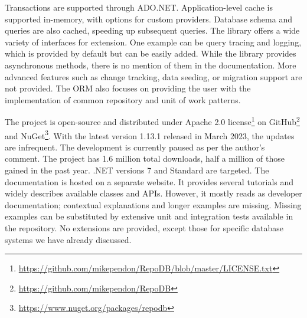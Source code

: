 Transactions are supported through ADO.NET. Application-level cache is supported in-memory, with options for custom providers. Database schema and queries are also cached, speeding up subsequent queries. The library offers a wide variety of interfaces for extension. One example can be query tracing and logging, which is provided by default but can be easily added. While the library provides asynchronous methods, there is no mention of them in the documentation. More advanced features such as change tracking, data seeding, or migration support are not provided. The ORM also focuses on providing the user with the implementation of common repository and unit of work patterns.

The project is open-source and distributed under Apache 2.0 license\footnote{\url{https://github.com/mikependon/RepoDB/blob/master/LICENSE.txt}} on GitHub\footnote{\url{https://github.com/mikependon/RepoDB}} and NuGet\footnote{\url{https://www.nuget.org/packages/repodb}}. With the latest version 1.13.1 released in March 2023, the updates are infrequent. The development is currently paused as per the author's comment\cite{PendonRepoDBComment}. The project has 1.6 million total downloads, half a million of those gained in the past year. .NET versions 7 and Standard are targeted. The documentation is hosted on a separate website\cite{RepoDB}. It provides several tutorials and widely describes available classes and APIs. However, it mostly reads as developer documentation; contextual explanations and longer examples are missing. Missing examples can be substituted by extensive unit and integration tests available in the repository. No extensions are provided, except those for specific database systems we have already discussed.


